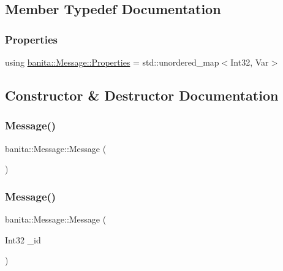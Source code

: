 \subsection{Member Typedef Documentation}
\mbox{\label{classbanita_1_1_message_ab38626a5034f095bf7d856e95ab89290}} 
\subsubsection{\texorpdfstring{Properties}{Properties}}
{\footnotesize\ttfamily using \mbox{\hyperlink{classbanita_1_1_message_ab38626a5034f095bf7d856e95ab89290}{banita\+::\+Message\+::\+Properties}} =  std\+::unordered\+\_\+map$<$Int32, Var$>$}



\subsection{Constructor \& Destructor Documentation}
\mbox{\label{classbanita_1_1_message_a24549655ea0b48a3a3f19cf3a40988cc}} 
\subsubsection{\texorpdfstring{Message()}{Message()}\hspace{0.1cm}{\footnotesize\ttfamily [1/3]}}
{\footnotesize\ttfamily banita\+::\+Message\+::\+Message (\begin{DoxyParamCaption}{ }\end{DoxyParamCaption})}

\mbox{\label{classbanita_1_1_message_a31f83b3410a80c1bc34c41d33faab5e6}} 
\subsubsection{\texorpdfstring{Message()}{Message()}\hspace{0.1cm}{\footnotesize\ttfamily [2/3]}}
{\footnotesize\ttfamily banita\+::\+Message\+::\+Message (\begin{DoxyParamCaption}\item[{Int32}]{\+\_\+id }\end{DoxyParamCaption})\hspace{0.3cm}{\ttfamily [inline]}}

